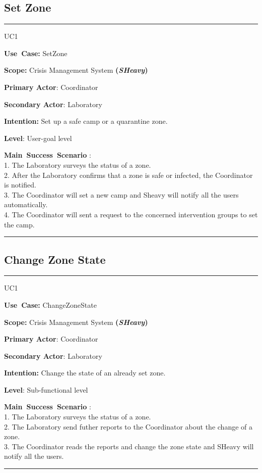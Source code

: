 \subsection{Set Zone}
\vspace{0.5cm}
\hrule
\vspace{0.5cm}
\begin{lyxlist}{UC1}
\small{
\item [\textbf{Use~Case:}] SetZone
\item [\textbf{Scope:}] Crisis Management System \textbf{(\emph{SHeavy})}
\item [\textbf{Primary Actor}:] Coordinator
\item [\textbf{Secondary Actor}:] Laboratory
\item [\textbf{Intention:}] Set up a safe camp or a quarantine zone.
\item [\textbf{Level}:]User-goal level
\item [\textbf{Main~Success~Scenario}]:\\
1. The Laboratory surveys the status of a zone.\\
2. After the Laboratory confirms that a zone is safe or infected, the
Coordinator is notified.\\
3. The Coordinator will set a new camp and Sheavy will notify all the users
automatically.\\ 
4.	The Coordinator will sent a request to the concerned intervention groups to
set the camp.\\
}
\end{lyxlist}
\hrule
\vspace{0.5cm} 

\subsection{Change Zone State}
\vspace{0.5cm}
\hrule
\vspace{0.5cm}
\begin{lyxlist}{UC1}
\small{
\item [\textbf{Use~Case:}] ChangeZoneState
\item [\textbf{Scope:}] Crisis Management System \textbf{(\emph{SHeavy})}
\item [\textbf{Primary Actor}:] Coordinator
\item [\textbf{Secondary Actor}:] Laboratory
\item [\textbf{Intention:}] Change the state of an already set zone.
\item [\textbf{Level}:]Sub-functional level
\item [\textbf{Main~Success~Scenario}]:\\
1. The Laboratory surveys the status of a zone.\\
2. The Laboratory send futher reports to the Coordinator about the change of a
zone.\\
3. The Coordinator reads the reports and change the zone state and SHeavy will
notify all the users.\\
}
\end{lyxlist}
\hrule
\vspace{0.5cm} 
 
